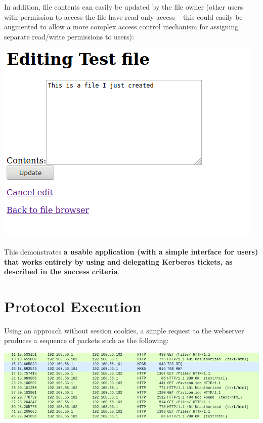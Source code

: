 \documentclass[12pt]{report}
\begin{document}
In addition, file contents can easily be updated by the file owner (other users with permission to access the file have read-only access -- this could easily be augmented to allow a more complex access control mechanism for assigning separate read/write permissions to users):

\begin{center}
  \includegraphics[scale=0.5]{07-browser3-file-contents.png}
\end{center}

This demonstrates \textbf{a usable application (with a simple interface for users) that works entirely by using and delegating Kerberos tickets, as described in the success criteria}.

\section{Protocol Execution}
\label{sec:protocol_execution}
Using an approach without session cookies, a simple request to the webserver produces a sequence of packets such as the following:

\begin{center}
  \includegraphics[width=\textwidth]{09-connect-no-cookie.png}
\end{center}
\end{document}
